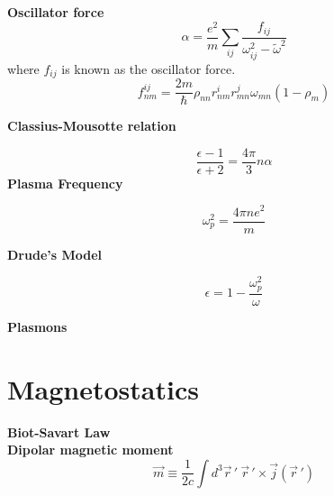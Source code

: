 \documentclass[12pt,a4paper]{article}
\begin{document}
\textbf{Oscillator force}\\
\begin{equation}
	\alpha = \frac{e^2}{m}\sum_{ij} \frac{f_{ij}}{\omega_{ij}^2-\tilde{\omega}^2}
\end{equation}
where $f_{ij}$ is known as the oscillator force.
\begin{equation}
	f_{nm}^{ij} = \frac{2m}{\hbar}\rho_{nn}r_{nm}^ir_{mn}^j\omega_{mn} (1-\rho_m)
\end{equation}

\textbf{Classius-Mousotte relation}

\begin{equation}
	\frac{\epsilon -1}{\epsilon + 2} = \frac{4\pi}{3}n\alpha
\end{equation}
\textbf{Plasma Frequency}

\begin{equation}
	\omega_p^2 = \frac{4\pi n e^2}{m}
\end{equation}

\textbf{Drude's Model}

\begin{equation}
	\epsilon = 1 - \frac{\omega_p^2}{\omega}
\end{equation}

\textbf{Plasmons}




\section{Magnetostatics}

\textbf{Biot-Savart Law}\\

\textbf{Dipolar magnetic moment}
\begin{equation}
	\vec{m} \equiv \frac{1}{2c} \int d^3 \vec{r}\,' \ \vec{r}\,'\times \vec{j}(\vec{r}\, ')
\end{equation}
\end{document}
